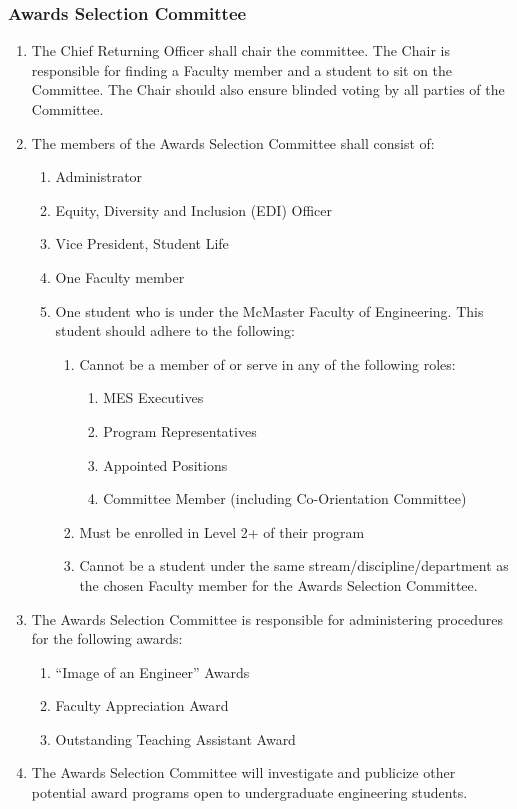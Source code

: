\subsubsection{Awards Selection Committee}
\label{awards-selection-committee}
\begin{enumerate}
 \item
  The Chief Returning Officer shall chair the committee. The Chair is responsible for finding a Faculty member and a student to sit on the Committee. The Chair should also ensure blinded voting by all parties of the Committee. 
 \item
  The members of the Awards Selection Committee shall consist of:

  \begin{enumerate}
   \item
    Administrator
   \item
    Equity, Diversity and Inclusion (EDI) Officer  
   \item     
    Vice President, Student Life
   \item
    One Faculty member
   \item
    One student who is under the McMaster Faculty of Engineering. This student should adhere to the following: 
   \begin {enumerate} 
    \item   
     Cannot be a member of or serve in any of the following roles: 
     \begin{enumerate}   
      \item    
       MES Executives   
      \item    
       Program Representatives   
      \item     
       Appointed Positions 
      \item    
       Committee Member (including Co-Orientation Committee)   
     \end{enumerate}   
    \item    
     Must be enrolled in Level 2+ of their program    
    \item    
     Cannot be a student under the same stream/discipline/department as the chosen Faculty member for the Awards Selection Committee. 
    \end{enumerate}   
      

  \end{enumerate}
 \item
  The Awards Selection Committee is responsible for administering procedures for the following awards:

  \begin{enumerate}
   \item
    ``Image of an Engineer'' Awards
   \item
    Faculty Appreciation Award
   \item
    Outstanding Teaching Assistant Award
  \end{enumerate}
 \item
  The Awards Selection Committee will investigate and publicize other potential award programs open to undergraduate engineering students.

\end{enumerate}

